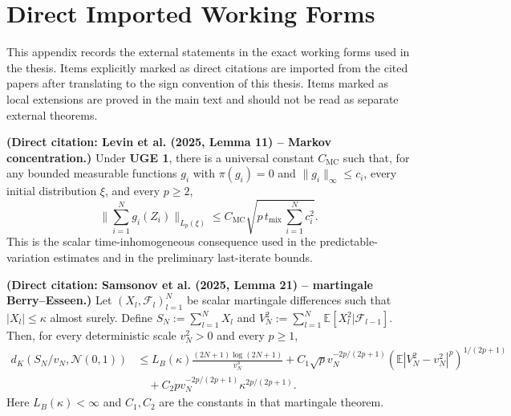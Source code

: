 
\section{Direct Imported Working Forms}\label{sec:external-direct-inputs}

This appendix records the external statements in the exact working forms used
in the thesis. Items explicitly marked as direct citations are imported from
the cited papers after translating to the sign convention of this thesis.
Items marked as local extensions are proved in the main text and should not be
read as separate external theorems.

\begin{lemma}\label{lem:external-markov-concentration}
  \textbf{(Direct citation: Levin et al. (2025, Lemma 11) -- Markov concentration.)}
  Under \textbf{UGE 1}, there is a universal constant $C_{\mathrm{MC}}$ such that, for any
  bounded measurable functions $g_{i}$ with $\pi(g_{i}) = 0$ and
  $\lVert g_{i} \rVert_{\infty} \le c_{i}$, every initial distribution $\xi$, and every
  $p \ge 2$,
  \begin{equation}
\lVert \sum_{i=1}^{N} g_{i}(Z_{i}) \rVert_{L_{p}(\xi)}
    \le C_{\mathrm{MC}} \sqrt{p \, t_{\mathrm{mix}} \, \sum_{i=1}^{N} c_{i}^{2}}.
\label{eq:external-markov-conc}
\end{equation}
  This is the scalar time-inhomogeneous consequence used in the
  predictable-variation estimates and in the preliminary last-iterate bounds.
\end{lemma}

\begin{lemma}\label{lem:external-martingale-be}
  \textbf{(Direct citation: Samsonov et al. (2025, Lemma 21) -- martingale
  Berry--Esseen.)}
  Let $(X_{l}, \mathcal{F}_{l})_{l = 1}^{N}$ be scalar martingale differences such that
  $|X_{l}| \le \kappa$ almost surely. Define
  $S_{N} := \sum_{l = 1}^{N} X_{l}$ and
  $V_{N}^{2} := \sum_{l = 1}^{N} \mathbb{E}[X_{l}^{2} | \mathcal{F}_{l - 1}]$.
  Then, for every deterministic scale $v_{N}^{2} > 0$ and every $p \ge 1$,
  \begin{equation}
\begin{aligned}
d_{K} \left( S_{N} / v_{N}, \mathcal{N}(0, 1) \right)
    &\le L_{B}(\kappa) \frac{(2 N + 1) \log\left(2 N + 1\right)}{v_{N}^{3}}
      + C_{1} \sqrt{p} v_{N}^{- 2 p / (2 p + 1)}
         (\mathbb{E}|V_{N}^{2} - v_{N}^{2}|^{p})^{1 / (2 p + 1)} \\
    &\quad + C_{2} p v_{N}^{- 2 p / (2 p + 1)}
         \kappa^{2 p / (2 p + 1)}.
\end{aligned}
\label{eq:external-martingale-be}
\end{equation}
  Here $L_{B}(\kappa) < \infty$ and $C_{1}, C_{2}$ are the constants in that
  martingale theorem.
\end{lemma}

